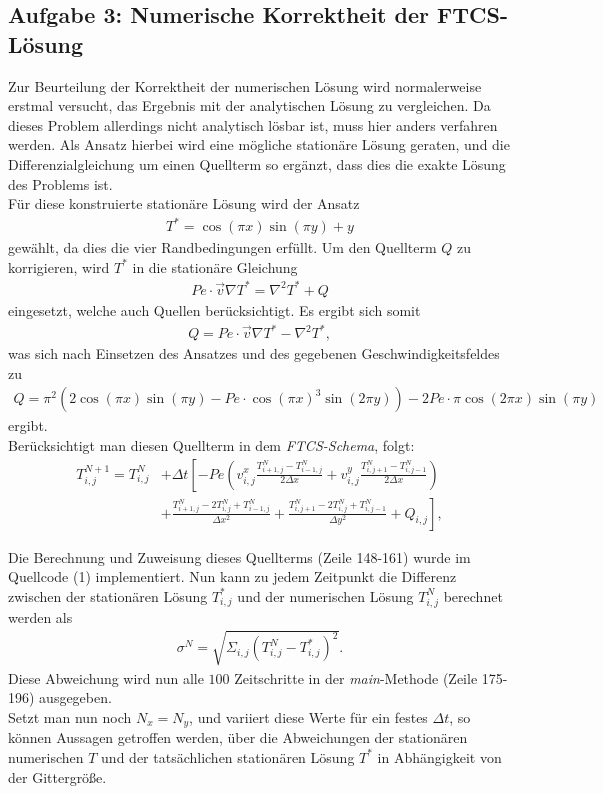 \documentclass[12pt,a4paper,titlepage,headinclude,bibtotoc]{scrartcl}
\begin{document}
\subsection{Aufgabe 3: Numerische Korrektheit der FTCS-Lösung}
\label{sec:task3}
Zur Beurteilung der Korrektheit der numerischen Lösung wird normalerweise erstmal versucht, das Ergebnis mit der analytischen Lösung zu vergleichen. Da dieses Problem allerdings nicht analytisch lösbar ist, muss hier anders verfahren werden. Als Ansatz hierbei wird eine mögliche stationäre Lösung geraten, und die Differenzialgleichung um einen Quellterm so ergänzt, dass dies die exakte Lösung des Problems ist.\\
Für diese konstruierte stationäre Lösung wird der Ansatz
\begin{align*}
T^* = \cos(\pi x) \sin(\pi y) + y
\end{align*} 
gewählt, da dies die vier Randbedingungen erfüllt.
Um den Quellterm $Q$ zu korrigieren, wird $T^*$ in die stationäre Gleichung
\begin{align*}
Pe \cdot \vec{v} \nabla T^* = \nabla^2 T^* + Q 
\end{align*}
eingesetzt, welche auch Quellen berücksichtigt. Es ergibt sich somit
\begin{align*}
Q = Pe \cdot \vec{v} \nabla T^* - \nabla^2 T^*,
\end{align*}
was sich nach Einsetzen des Ansatzes und des gegebenen Geschwindigkeitsfeldes zu
\begin{align*}
Q = \pi^2 \left(2 \cos(\pi x) \sin(\pi y) - Pe \cdot \cos(\pi x)^3 \sin(2 \pi y) \right) - 2 Pe \cdot \pi \cos(2 \pi x) \sin(\pi y)
\end{align*}
ergibt.\\
Berücksichtigt man diesen Quellterm in dem \textit{FTCS-Schema}, folgt:
\begin{align}
\label{eq:ftcs_source}
T_{i,j}^{N+1} = T_{i,j}^N & + \Delta t \left[ -Pe \left( v^x_{i,j} \frac{T_{i+1,j}^N-T_{i-1,j}^N}{2\Delta x}+v^y_{i,j} \frac{T_{i,j+1}^N-T_{i,j-1}^N}{2\Delta x} \right) \right. \nonumber \\ 
 & \left.+ \frac{ T_{i+1,j}^N - 2 T_{i,j}^N +  T_{i-1,j}^N }{\Delta x^2} 
+ \frac{ T_{i,j+1}^N - 2  T_{i,j}^N + T_{i,j-1}^N}{\Delta y^2} + Q_{i,j} \right],
\end{align}

Die Berechnung und Zuweisung dieses Quellterms (Zeile 148-161) wurde im Quellcode (1) implementiert. 
Nun kann zu jedem Zeitpunkt die Differenz zwischen der stationären Lösung $T_{i,j}^*$ und der numerischen Lösung $T_{i,j}^N$ berechnet werden als
\begin{align*}
\sigma^N = \sqrt{\Sigma_{i,j} (T_{i,j}^N - T_{i,j}^*)^2 }.
\end{align*}
Diese Abweichung wird nun alle $100$ Zeitschritte in der \textit{main}-Methode (Zeile 175-196) ausgegeben.\\
Setzt man nun noch $N_x = N_y$, und variiert diese Werte für ein festes $\Delta t$, so können Aussagen getroffen werden, über die Abweichungen der stationären numerischen $T$ und der tatsächlichen stationären Lösung $T^*$ in Abhängigkeit von der Gittergröße.
\end{document}
